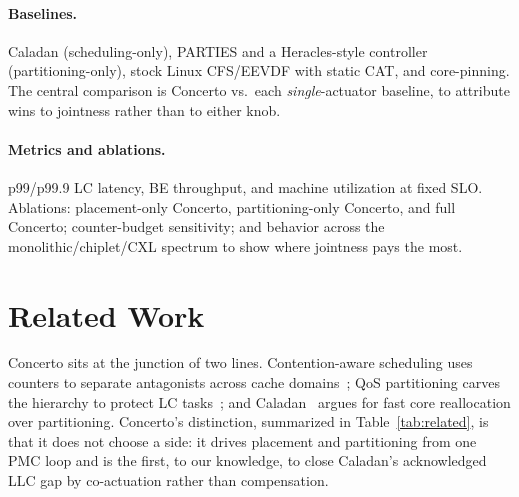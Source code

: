 \documentclass[sigconf,nonacm]{acmart}
\begin{document}
\paragraph{Baselines.} Caladan (scheduling-only), PARTIES and a Heracles-style
controller (partitioning-only), stock Linux CFS/EEVDF with static CAT, and
core-pinning. The central comparison is Concerto vs.\ each \emph{single}-actuator
baseline, to attribute wins to jointness rather than to either knob.

\paragraph{Metrics and ablations.} p99/p99.9 LC latency, BE throughput, and
machine utilization at fixed SLO. Ablations: placement-only Concerto,
partitioning-only Concerto, and full Concerto; counter-budget sensitivity; and
behavior across the monolithic/chiplet/CXL spectrum to show where jointness pays
the most.

\section{Related Work}
Concerto sits at the junction of two lines. Contention-aware scheduling uses
counters to separate antagonists across cache
domains~\cite{zhuravlev2010contention,blagodurov2010contentionaware,
fedorova2007isolation,tam2007clustering,suh2002memory}; QoS partitioning carves
the hierarchy to protect LC tasks~\cite{lo2015heracles,chen2019parties}; and
Caladan~\cite{fried2020caladan} argues for fast core reallocation over
partitioning. Concerto's distinction, summarized in Table~\ref{tab:related}, is
that it does not choose a side: it drives placement and partitioning from one PMC
loop and is the first, to our knowledge, to close Caladan's acknowledged LLC gap
by co-actuation rather than compensation.
\end{document}
